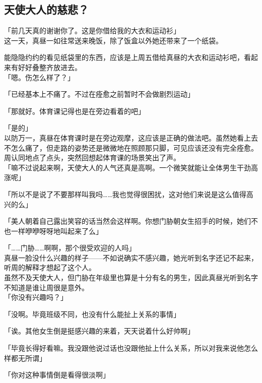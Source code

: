\subsection{天使大人的慈悲？}

「前几天真的谢谢你了。这是你借给我的大衣和运动衫」\\

这一天，真昼一如往常送来晚饭，除了饭盒以外她还带来了一个纸袋。

能隐隐约约的看见纸袋里的东西，应该是上周五借给真昼的大衣和运动衫吧，看起来有好好叠整齐放进去。\\

「嗯。伤怎么样了？」

「已经基本上不痛了。不过在痊愈之前暂时不会做剧烈运动」

「那就好。体育课记得也是在旁边看着的吧」

「是的」\\

以防万一，真昼在体育课时是在旁边观摩，这应该是正确的做法吧。虽然她看上去不怎么痛了，但走路的姿势还是微微地在照顾那只脚，可见应该还没有完全痊愈。\\

周认同地点了点头，突然回想起体育课的场景笑出了声。\\

「嘛不过说起来啊，天使大人的人气还真是高啊。一个微笑就能让全体男生干劲高涨呢」

「所以不是说了不要那样叫我吗……我也觉得很困扰，这对他们来说是这么值得高兴的么」

「美人朝着自己露出笑容的话当然会这样啊。你想门胁朝女生招手的时候，她们不也一样咿咿呀呀地叫起来了么」

「……门胁……啊啊，那个很受欢迎的人吗」\\

真昼一脸没什么兴趣的样子——不如说确实不感兴趣，她光听到名字还记不起来，听周的解释才想起了这个人。\\

虽然不及天使大人，但门胁在年级里也算是十分有名的男生，因此真昼光听到名字不知道是谁让周很是意外。\\

「你没有兴趣吗？」

「没啊。毕竟班级不同，也没有什么能扯上关系的事情」

「诶。其他女生倒是挺感兴趣的来着，天天说着什么好帅啊」

「毕竟长得好看嘛。我没跟他说过话也没跟他扯上什么关系，所以对我来说他怎么样都无所谓」

「你对这种事情倒是看得很淡啊」

